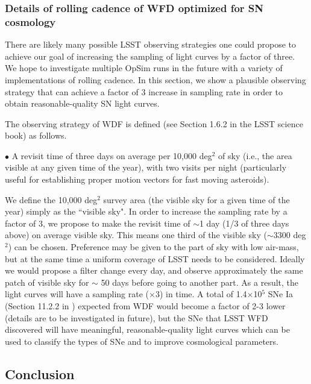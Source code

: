 \subsubsection{Details of rolling cadence of WFD optimized for SN cosmology }
There are likely many possible LSST observing strategies one could propose to achieve our
goal of increasing the sampling of light curves by a factor of three. We hope to investigate
multiple OpSim runs in the future with a variety of implementations of rolling cadence.
In this section, we show a plausible observing strategy
that can achieve a factor of 3 increase in sampling rate in order to obtain reasonable-quality SN light curves.


The observing strategy of WDF is defined (see Section 1.6.2 in the LSST science book) as follows.

\noindent $\bullet$ A revisit time of three days on average per 10,000 deg$^2$ of sky (i.e., the area visible at any given time of the year), with two visits per night (particularly useful for establishing proper motion vectors for fast moving asteroids).

We define the 10,000 deg$^2$ survey area (the visible sky for a given time of the
year) simply as the ``visible sky".
In order to increase the sampling rate by a factor of 3, we propose to make the revisit time of $\sim$1 day (1/3 of three days above)
on average visible
sky. This means one third of the visible sky ($\sim$3300 deg$^2$) can be chosen. Preference
may be given to the part of
sky with low air-mass, but at the same time
a uniform coverage of LSST needs to be considered.
Ideally we would propose a filter change every day, and observe approximately the same
patch of visible sky for
$\sim$ 50 days before
going to another part.
As a result,
 the light curves will have  a sampling rate ($\times$3) in time.
A total of 1.4$\times$10$^5$ SNe Ia (Section 11.2.2 in \citet{2009arXiv0912.0201L}) expected from
WDF would become a factor of 2-3 lower
(details are to be investigated in future), but
the SNe that LSST WFD discovered will have  meaningful, reasonable-quality light curves which can be used to
classify the types of SNe and to improve cosmological parameters.

\subsection{Conclusion}

